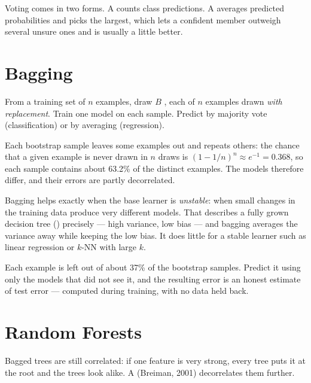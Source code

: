Voting comes in two forms. A  counts class predictions. A
 averages predicted probabilities and picks the largest, which lets
a confident member outweigh several unsure ones and is usually a little better.

\section{Bagging}

\begin{definitionbox}
From a training set of $n$ examples, draw $B$ , each of $n$
examples drawn \emph{with replacement}. Train one model on each sample. Predict by
majority vote (classification) or by averaging (regression).
\end{definitionbox}

Each bootstrap sample leaves some examples out and repeats others: the chance that a
given example is never drawn in $n$ draws is $(1 - 1/n)^n \approx e^{-1} = 0.368$, so
each sample contains about 63.2\% of the distinct examples. The models therefore
differ, and their errors are partly decorrelated.

Bagging helps exactly when the base learner is \emph{unstable}: when small changes
in the training data produce very different models. That describes a fully grown
decision tree () precisely --- high variance, low bias --- and bagging
averages the variance away while keeping the low bias. It does little for a stable
learner such as linear regression or $k$-NN with large $k$.

\begin{conceptbox}
Each example is left out of about 37\% of the bootstrap samples. Predict it using
only the models that did not see it, and the resulting  error is an
honest estimate of test error --- computed during training, with no data held back.
\end{conceptbox}

\section{Random Forests}

Bagged trees are still correlated: if one feature is very strong, every tree puts it
at the root and the trees look alike. A  (Breiman, 2001)
decorrelates them further.

